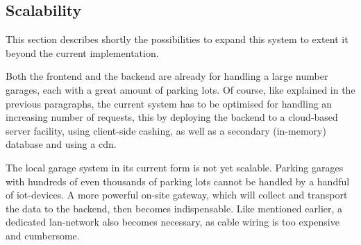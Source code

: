 \subsection{Scalability}
This section describes shortly the possibilities to expand this system to extent it beyond the current implementation.

\ind Both the frontend and the backend are already for handling a large number garages, each with a great amount of parking lots. Of course, like explained in the previous paragraphs, the current system has to be optimised for handling an increasing number of requests, this by deploying the backend to a cloud-based server facility, using client-side cashing, as well as a secondary (in-memory) database and using a \ac{cdn}.

\ind The local garage system in its current form is not yet scalable. Parking garages with hundreds of even thousands of parking lots cannot be handled by a handful of \ac{iot}-devices. A more powerful on-site gateway, which will collect and transport the data to the backend, then becomes indispensable. Like mentioned earlier, a dedicated \ac{lan}-network also becomes necessary, as cable wiring is too expensive and cumbersome.





